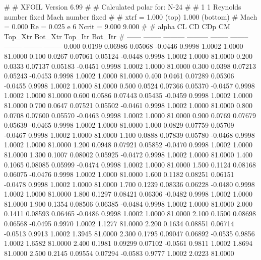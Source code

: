 #  
#       XFOIL         Version 6.99
#  
# Calculated polar for: N-24                                            
#  
# 1 1 Reynolds number fixed          Mach number fixed         
#  
# xtrf =   1.000 (top)        1.000 (bottom)  
# Mach =   0.000     Re =     0.025 e 6     Ncrit =   9.000  9.000
#  
#   alpha    CL        CD       CDp       CM     Top_Xtr  Bot_Xtr  Top_Itr  Bot_Itr
#  ------ -------- --------- --------- -------- -------- -------- -------- --------
   0.000   0.0199   0.06986   0.05068  -0.0446   0.9998   1.0002   1.0000  81.0000
   0.100   0.0267   0.07061   0.05124  -0.0448   0.9998   1.0002   1.0000  81.0000
   0.200   0.0333   0.07137   0.05183  -0.0451   0.9998   1.0002   1.0000  81.0000
   0.300   0.0398   0.07213   0.05243  -0.0453   0.9998   1.0002   1.0000  81.0000
   0.400   0.0461   0.07289   0.05306  -0.0455   0.9998   1.0002   1.0000  81.0000
   0.500   0.0524   0.07366   0.05370  -0.0457   0.9998   1.0002   1.0000  81.0000
   0.600   0.0586   0.07443   0.05435  -0.0459   0.9998   1.0002   1.0000  81.0000
   0.700   0.0647   0.07521   0.05502  -0.0461   0.9998   1.0002   1.0000  81.0000
   0.800   0.0708   0.07600   0.05570  -0.0463   0.9998   1.0002   1.0000  81.0000
   0.900   0.0769   0.07679   0.05639  -0.0465   0.9998   1.0002   1.0000  81.0000
   1.000   0.0829   0.07759   0.05709  -0.0467   0.9998   1.0002   1.0000  81.0000
   1.100   0.0888   0.07839   0.05780  -0.0468   0.9998   1.0002   1.0000  81.0000
   1.200   0.0948   0.07921   0.05852  -0.0470   0.9998   1.0002   1.0000  81.0000
   1.300   0.1007   0.08002   0.05925  -0.0472   0.9998   1.0002   1.0000  81.0000
   1.400   0.1065   0.08085   0.05999  -0.0474   0.9998   1.0002   1.0000  81.0000
   1.500   0.1124   0.08168   0.06075  -0.0476   0.9998   1.0002   1.0000  81.0000
   1.600   0.1182   0.08251   0.06151  -0.0478   0.9998   1.0002   1.0000  81.0000
   1.700   0.1239   0.08336   0.06228  -0.0480   0.9998   1.0002   1.0000  81.0000
   1.800   0.1297   0.08421   0.06306  -0.0482   0.9998   1.0002   1.0000  81.0000
   1.900   0.1354   0.08506   0.06385  -0.0484   0.9998   1.0002   1.0000  81.0000
   2.000   0.1411   0.08593   0.06465  -0.0486   0.9998   1.0002   1.0000  81.0000
   2.100   0.1500   0.08698   0.06568  -0.0495   0.9970   1.0002   1.1277  81.0000
   2.200   0.1634   0.08851   0.06714  -0.0513   0.9913   1.0002   1.3945  81.0000
   2.300   0.1795   0.09047   0.06892  -0.0535   0.9856   1.0002   1.6582  81.0000
   2.400   0.1981   0.09299   0.07102  -0.0561   0.9811   1.0002   1.8694  81.0000
   2.500   0.2145   0.09554   0.07294  -0.0583   0.9777   1.0002   2.0223  81.0000
